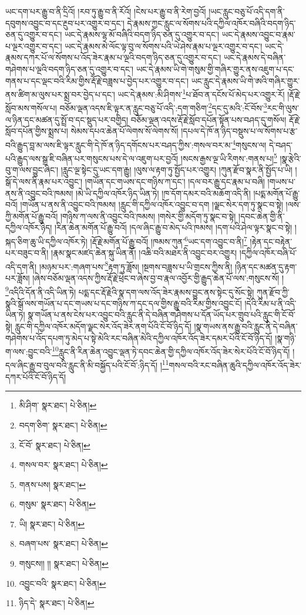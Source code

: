 ཡང་དག་པར་རྒྱུ་བ་ནི་དྲིའོ། །རབ་ཏུ་རྒྱུ་བ་ནི་རོའོ། །ངེས་པར་རྒྱུ་བ་ནི་རེག་བྱའོ། །ཡང་རླུང་བཅུ་པོ་འདི་དག་ནི་དབུགས་འབྱུང་བ་དང་རྔུབ་པར་འགྱུར་བ་དང་། དེ་རྣམས་ཀྱང་རླུང་ལ་སོགས་པའི་དཀྱིལ་འཁོར་བཞིའི་བདག་ཉིད་ཅན་དུ་འགྱུར་བ་དང་། ཡང་དེ་རྣམས་ལྷ་མོ་བཞིའི་བདག་ཉིད་ཅན་དུ་འགྱུར་བ་དང་། ཡང་དེ་རྣམས་འབྱུང་བ་རྣམ་པ་ལྔར་འགྱུར་བ་དང་། ཡང་དེ་རྣམས་མེ་ལོང་ལྟ་བུ་ལ་སོགས་པའི་ཡེ་ཤེས་རྣམ་པ་ལྔར་འགྱུར་བ་དང་། ཡང་དེ་རྣམས་དཀར་པོ་ལ་སོགས་པ་འོད་ཟེར་རྣམ་པ་ལྔའི་བདག་ཉིད་ཅན་དུ་འགྱུར་བ་དང་། ཡང་དེ་རྣམས་དེ་བཞིན་གཤེགས་པ་ལྔའི་བདག་ཉིད་ཅན་དུ་འགྱུར་བ་དང་། ཡང་དེ་རྣམས་ཡི་གེ་གསུམ་གྱི་གཞིར་གྱུར་ནས་འཇུག་པ་དང་གནས་པ་དང་ལྡང་བའི་རིམ་གྱིས་རྡོ་རྗེ་བཟླས་པ་བྱེད་པར་འགྱུར་བ་དང་། ཡང་རླུང་དེ་རྣམས་ཡི་གེ་ཨའི་གཞིར་གྱུར་ནས་ཚིག་མ་ལུས་པར་སྨྲ་བར་བྱེད་པ་དང་། ཡང་དེ་རྣམས་:མི་ཤིགས་\footnote{མི་ཤིག་  སྣར་ཐང་།  པེ་ཅིན། }པ་ཐོབ་ན་དངོས་པོ་མེད་པར་འགྱུར་རོ། །རྡོ་རྗེ་སློབ་མས་གསོལ་པ། བཅོམ་ལྡན་འདས་ཇི་ལྟར་ན་རླུང་བཅུ་པོ་འདི་:དག་གཅིག་\footnote{བདག་ཅིག་  སྣར་ཐང་།  པེ་ཅིན། }དང་དུ་མའི་:ངོ་བོས་\footnote{ངོ་བོ་  སྣར་ཐང་།  པེ་ཅིན། }རང་གི་ལུས་ལ་ཉིན་དང་མཚན་དུ་སྤྲོ་བ་དང་སྡུད་པར་བགྱིད། བཅོམ་ལྡན་འདས་རྡོ་རྗེ་སློབ་དཔོན་སྟོན་པས་བཤད་དུ་གསོལ། རྡོ་རྗེ་སློབ་དཔོན་གྱིས་སྨྲས་པ། སེམས་དཔའ་ཆེན་པོ་ལེགས་སོ་ལེགས་སོ། །དཔལ་དེ་ཁོ་ན་ཉིད་བསྡུས་པ་ལ་སོགས་པ་རྩ་བའི་རྒྱུད་བླ་མ་ལས་ཇི་ལྟར་རླུང་གི་དེ་ཁོ་ན་ཉིད་དགོངས་པར་བཤད་ཀྱིས་:གསལ་བར་མ་\footnote{གསལ་བར་  སྣར་ཐང་།  པེ་ཅིན། }གསུངས་ལ། དེ་བཤད་པའི་རྒྱུད་ལས་སྒྲ་ཇི་བཞིན་པར་གསུངས་པས་དེ་ལ་འཇུག་པར་བྱའོ། །སངས་རྒྱས་ལྔ་ཡི་རིགས་:གནས་པ།\footnote{གནས་པས།  སྣར་ཐང་། } །སྣ་རྩེའི་བུ་ག་ལས་བྱུང་ཞིང་། །རླུང་ལྔ་སྟེང་དུ་ཡང་དག་རྒྱུ། །ལུས་ལ་རྟག་ཏུ་སྤྱོད་པར་འགྱུར། །ཀུན་རྫོབ་སྣར་ནི་སྤྱོད་པ་ཡི། །སྒོ་དེ་ལས་ནི་རྣམ་པར་འབྱུང་། །གཡོན་དང་གཡས་དང་གཉིས་ཀ་དང་། །དལ་བར་རྒྱུ་དང་རྣམ་པ་བཞི། །གཡས་པ་ནས་ནི་འབྱུང་བའི་ཁམས། །མེ་ཡི་དཀྱིལ་འཁོར་ཉིད་ཡིན་ཏེ། །ཁ་དོག་དམར་བའི་མཆོག་འདི་ནི། །པདྨ་མགོན་པོ་རྒྱུ་བའོ། །གཡོན་པ་ནས་ནི་འབྱུང་བའི་ཁམས། །རླུང་གི་དཀྱིལ་འཁོར་འབྱུང་བ་དག །ལྗང་སེར་དག་ཏུ་སྣང་བ་སྟེ། །ལས་ཀྱི་མགོན་པོ་རྒྱུ་བའོ། །གཉིས་ཀ་ལས་ནི་འབྱུང་བའི་ཁམས། །གསེར་གྱི་མདོག་ཏུ་སྣང་བ་སྟེ། །དབང་ཆེན་གྱི་ནི་དཀྱིལ་འཁོར་ཉིད། །རིན་ཆེན་མགོན་པོ་རྒྱུ་བའོ། །དལ་ཞིང་རྒྱུ་བ་མེད་པའི་ཁམས། །དག་པའི་ཤེལ་ལྟར་སྣང་བ་སྟེ། །སྐད་ཅིག་ཆུ་ཡི་དཀྱིལ་འཁོར་ཏེ། །རྡོ་རྗེ་མགོན་པོ་རྒྱུ་བའོ། །ཁམས་ཀུན་\footnote{གསུམ་  སྣར་ཐང་།  པེ་ཅིན། }ཡང་དག་འབྱུང་བ་ནི།\footnote{ཡི།  སྣར་ཐང་།  པེ་ཅིན། } །རྟེན་དང་བརྟེན་པར་བཟུང་བ་ནི། །རྣམ་སྣང་མཛད་ཆེན་སྐུ་ཡིན་ནོ། །འཆི་བའི་མཐར་ནི་འབྱུང་བར་འགྱུར། །དཀྱིལ་འཁོར་བཞི་པོ་འདི་དག་ནི། །མཉམ་པར་:གཞག་པས་\footnote{བཞག་པས་  སྣར་ཐང་།  པེ་ཅིན། }རྟག་ཏུ་ཟློས། །སྔགས་བཟླས་པ་ཡི་གྲངས་ཀྱིས་ནི། །ཉིན་དང་མཚན་དུ་རྟག་པར་ཟློས། །ཞེས་བཅོམ་ལྡན་འདས་ཀྱིས་རྡོ་རྗེ་ཕྲེང་བ་ཞེས་བྱ་བ་རྣལ་འབྱོར་གྱི་རྒྱུད་ཆེན་པོ་ལས་:གསུངས་སོ། །\footnote{གསུངས།། །།  སྣར་ཐང་།  པེ་ཅིན། }འདིའི་དོན་ནི་འདི་ཡིན་ཏེ། པདྨ་དང་རྡོ་རྗེའི་སྣ་དག་ལས་འོད་ཟེར་རྣམས་བྱུང་ནས་སྟེང་དུ་སོང་སྟེ། ཀུན་རྫོབ་ཀྱི་སྣའི་སྒོ་ལས་གཡོན་པ་དང་གཡས་པ་དང་གཉིས་ཀ་དང་དལ་གྱིས་རྒྱུ་བའི་རིམ་གྱིས་འབྱུང་ངོ། །དེའི་རིམ་པ་ནི་འདི་ཡིན་ཏེ། སྣ་གཡོན་པ་ནས་ངེས་པར་འབྱུང་བའི་རླུང་ནི་དེ་བཞིན་གཤེགས་པ་དོན་ཡོད་པར་གྲུབ་པའི་རླུང་གི་ངོ་བོ་སྟེ། རླུང་གི་དཀྱིལ་འཁོར་མདོག་ལྗང་སེར་འོད་ཟེར་ནག་པོའི་ངོ་བོ་ཉིད་དོ། །སྣ་གཡས་ནས་རྒྱུ་བའི་རླུང་ནི་དེ་བཞིན་གཤེགས་པ་འོད་དཔག་ཏུ་མེད་པ་སྟེ་མེའི་རང་བཞིན་མེའི་དཀྱིལ་འཁོར་འོད་ཟེར་དམར་པོའི་ངོ་བོ་ཉིད་དོ། །སྣ་གཉི་ག་ལས་:བྱུང་བའི་\footnote{འབྱུང་བའི་  སྣར་ཐང་།  པེ་ཅིན། }རླུང་ནི་རིན་ཆེན་འབྱུང་ལྡན་ཏེ་དབང་ཆེན་གྱི་དཀྱིལ་འཁོར་འོད་ཟེར་སེར་པོའི་ངོ་བོ་ཉིད་དོ། །དལ་ཞིང་རྒྱུ་བ་བུལ་བའི་རླུང་ནི་མི་བསྐྱོད་པའི་ངོ་བོ་:ཉིད་དོ། །\footnote{ཉིད་དེ་  སྣར་ཐང་།  པེ་ཅིན། }གསལ་བའི་རང་བཞིན་ཆུའི་དཀྱིལ་འཁོར་འོད་ཟེར་དཀར་པོའི་ངོ་བོ་ཉིད་དོ། 